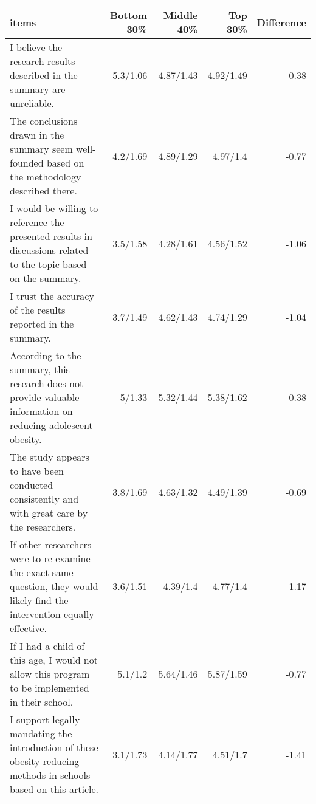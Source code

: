 \begin{longtable}{lrrrr}
\toprule
items & Bottom 30\% & Middle 40\% & Top 30\% & Difference \\ 
\midrule\addlinespace[2.5pt]
I believe the research results described in the summary are unreliable. & 5.3/1.06 & 4.87/1.43 & 4.92/1.49 & 0.38 \\ 
The conclusions drawn in the summary seem well-founded based on the methodology described there. & 4.2/1.69 & 4.89/1.29 & 4.97/1.4 & -0.77 \\ 
I would be willing to reference the presented results in discussions related to the topic based on the summary. & 3.5/1.58 & 4.28/1.61 & 4.56/1.52 & -1.06 \\ 
I trust the accuracy of the results reported in the summary. & 3.7/1.49 & 4.62/1.43 & 4.74/1.29 & -1.04 \\ 
According to the summary, this research does not provide valuable information on reducing adolescent obesity. & 5/1.33 & 5.32/1.44 & 5.38/1.62 & -0.38 \\ 
The study appears to have been conducted consistently and with great care by the researchers. & 3.8/1.69 & 4.63/1.32 & 4.49/1.39 & -0.69 \\ 
If other researchers were to re-examine the exact same question, they would likely find the intervention equally effective. & 3.6/1.51 & 4.39/1.4 & 4.77/1.4 & -1.17 \\ 
If I had a child of this age, I would not allow this program to be implemented in their school. & 5.1/1.2 & 5.64/1.46 & 5.87/1.59 & -0.77 \\ 
I support legally mandating the introduction of these obesity-reducing methods in schools based on this article. & 3.1/1.73 & 4.14/1.77 & 4.51/1.7 & -1.41 \\ 
\bottomrule
\end{longtable}

